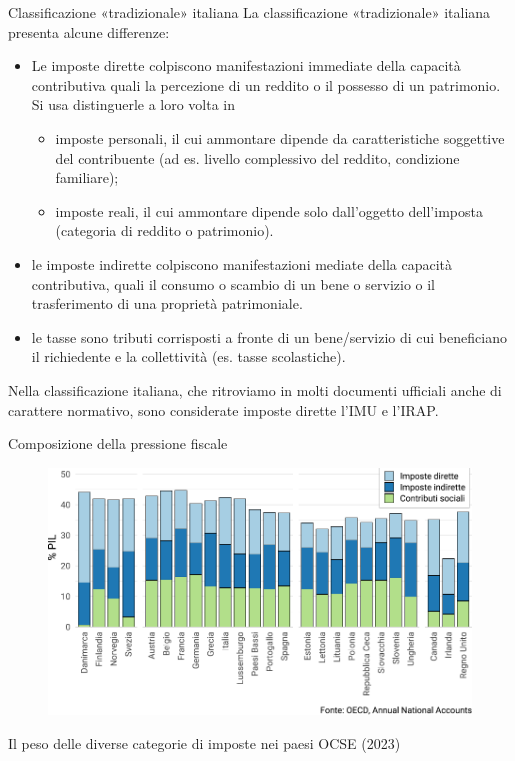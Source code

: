 \documentclass[aspectratio=64,12pt]{beamer}
\begin{document}
\begin{frame}{Classificazione «tradizionale» italiana}
La classificazione «tradizionale» italiana presenta alcune differenze:
\begin{itemize}
\item Le \alert{imposte dirette} colpiscono manifestazioni immediate della
  capacità contributiva quali la percezione di un reddito o il possesso di un
  patrimonio. Si usa distinguerle a loro volta in
\begin{itemize}
\item imposte \alert{personali}, il cui ammontare dipende da caratteristiche
soggettive del contribuente (ad es. livello complessivo del reddito,
condizione familiare);
\item imposte \alert{reali}, il cui ammontare dipende solo dall'oggetto dell'imposta
(categoria di reddito o patrimonio).
\end{itemize}
\item le \alert{imposte indirette} colpiscono manifestazioni mediate della capacità
contributiva, quali il consumo o scambio di un bene o servizio o il
trasferimento di una proprietà patrimoniale.
\item le \alert{tasse} sono tributi corrisposti a fronte di un bene/servizio di cui beneficiano il richiedente e la collettività (es. tasse scolastiche).
\end{itemize}

\begin{block}{}
Nella classificazione italiana, che ritroviamo in molti documenti ufficiali anche di carattere normativo, sono considerate imposte dirette l'IMU e l'IRAP.
\end{block}
\end{frame}

\begin{frame}{Composizione della pressione fiscale}
\begin{figure}[htbp]
\centering
\includegraphics[width=\textwidth]{./figure/classificazione-imposte-oecd-color-2023.pdf}
\end{figure}

\vspace{-3mm}
Il peso delle diverse categorie di imposte nei paesi OCSE (2023)
\end{frame}
\end{document}
